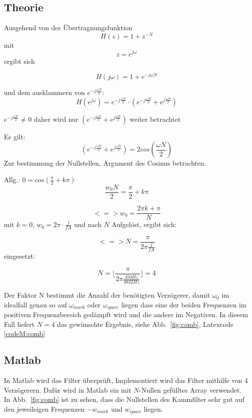 \documentclass{article}
\begin{document}
\subsection{Theorie}


Ausgehend von der Übertragnungsfunktion 
$$H(z) = 1 + z^{-N}$$ 
mit 
$$ z = e^{j\omega} $$
ergibt sich

$$H(j\omega) = 1 + e^{-j\omega N}$$

und dem ausklammern von $ e^{-j \frac{\omega N}{2}}$:
$$
H(e^{j\omega}) = e^{-j \frac{\omega N}{2}} \cdot (e^{-j \frac{\omega N}{2}} + e^{j \frac{\omega N}{2}})
$$

$e^{-j \frac{\omega N}{2}} \neq 0$ daher wird nur $(e^{-j \frac{\omega N}{2}} + e^{j \frac{\omega N}{2}})$ weiter betrachtet

Es gilt:
$$
(e^{-j \frac{\omega N}{2}} + e^{j \frac{\omega N}{2}}) = 2  cos(\frac{\omega N}{2})
$$
Zur bestimmung der Nullstellen, Argument des Cosinus betrachten.

Allg.: $0 = cos(\frac{\pi}{2} + k\pi)$
$$
\frac{w_0 N}{2} = \frac{\pi}{2} + k\pi
$$

$$
<=> w_0 = \frac{2\pi k + \pi}{N}
$$
mit $k = 0$, $w_0 = 2\pi \cdot \frac{f}{fA}$ und nach $N$ Aufgelöst, ergibt sich:

$$
<=> N = \frac{\pi}{2\pi \frac{f}{fA}}
$$
eingesetzt:

$$
N = \lfloor \frac{\pi}{2\pi \frac{450Hz}{3832Hz}}\rfloor = 4
$$

Der Faktor N bestimmt die Anzahl der benötigten Verzögerer, damit $\omega_0$ im idealfall genau so auf $\omega_{mark}$ oder $\omega_{space}$ liegen dass eine der beiden 
Frequenzen im positiven Frequenzbereich gedämpft wird und die andere im Negativen. In diesem Fall liefert $N = 4$ das gewünschte Ergebnis, siehe Abb.~\ref{fig:comb}, Latexcode \ref{codeM:comb}

\subsection{Matlab}
In Matlab wird das Filter überprüft, Implementiert wird das Filter mithilfe von 4 Verzögerern.
Dafür wird in Matlab ein mit $N$-Nullen gefülltes Array verwendet. In Abb.~\ref{fig:comb} ist zu sehen,
dass die Nullstellen des Kammfilter sehr gut auf den jeweileigen Frequenzen $- w_{mark}$ und $w_{space}$ liegen.
\end{document}
